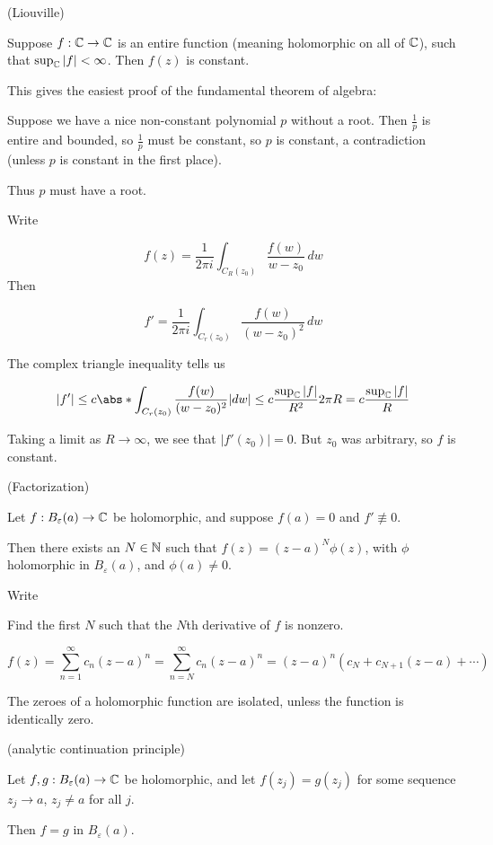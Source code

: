 \documentclass[x11names,reqno,14pt]{extarticle}
\newcommand{\oo}{{\infty}}
\begin{document}
\thm (Liouville)

Suppose $f:\mathbb{C}\to\mathbb{C}$ is an entire function (meaning holomorphic on all of $\mathbb{C}$), such that $\sup_{\C}|f| < \oo$. Then $f(z)$ is constant. 

\rem This gives the easiest proof of the fundamental theorem of algebra:

Suppose we have a nice non-constant polynomial $p$ without a root. Then $\frac{1}{p}$ is entire and bounded, so $\frac{1}{p}$ must be constant, so $p$ is constant, a contradiction (unless $p$ is constant in the first place).

Thus $p$ must have a root. 


\proof

Write 

\[
f(z) = \frac{1}{2\pi i}\int_{C_R(z_0)}\frac{f(w)}{w - z_0}\,dw
\] Then 

\[
f' = \frac{1}{2\pi i}\int_{C_r(z_0)}\frac{f(w)}{(w - z_0)^2}\,dw
\]

The complex triangle inequality tells us

\[
|f'| \leq c\abs*{\int_{C_r(z_0)}\frac{f(w)}{(w - z_0)^2}}|dw| \leq c \frac{\sup_{\C}|f|}{R^2}2\pi R = c\frac{\sup_{\C}|f|}{R} 
\]

Taking a limit as $R\to\oo$, we see that $|f'(z_0)| = 0$. But $z_0$ was arbitrary, so $f$ is constant. 

\thm (Factorization)

Let $f:B_{\varepsilon}(a)\to\mathbb{C}$ be holomorphic, and suppose $f(a) = 0$ and $f' \not\equiv 0$. 

Then there exists an $N \in \mathbb{N}$ such that $f(z) = (z - a)^N\phi(z)$, with $\phi$ holomorphic in $B_{\varepsilon}(a)$, and $\phi(a)\neq 0$. 

\proof

Write 

Find the first $N$ such that the $N$th derivative of $f$ is nonzero. 

\[
f(z) = \sum_{n=1}^\oo c_n(z - a)^n = \sum_{n=N}^\oo c_n(z - a)^n = (z - a)^n(c_N + c_{N + 1}(z - a) + \cdots )
\]

\cor

The zeroes of a holomorphic function are isolated, unless the function is identically zero. 

\cor(analytic continuation principle)

Let $f, g:B_{\varepsilon}(a)\to\mathbb{C}$ be holomorphic, and let $f(z_j) = g(z_j)$ for some sequence $z_j \to a$, $z_j \neq a$ for all $j$. 

Then $f = g$ in $B_{\varepsilon}(a)$. 
\end{document}
